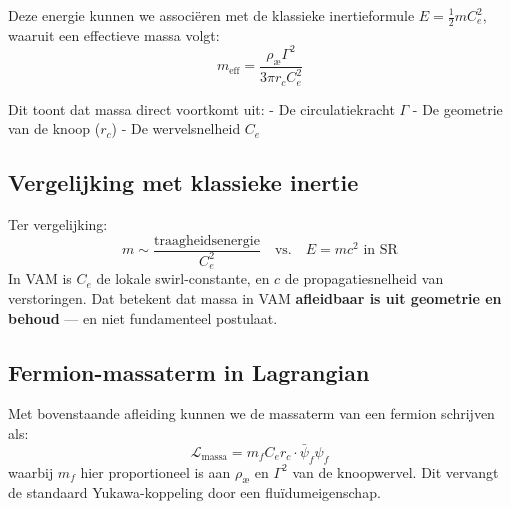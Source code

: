 Deze energie kunnen we associëren met de klassieke inertieformule $E = \frac{1}{2} m C_e^2$, waaruit een effectieve massa volgt:
\[
    m_\text{eff} = \frac{\rho_\text{\ae} \Gamma^2}{3\pi r_c C_e^2}
\]

Dit toont dat massa direct voortkomt uit:
- De circulatiekracht $\Gamma$
- De geometrie van de knoop ($r_c$)
- De wervelsnelheid $C_e$

\subsection*{Vergelijking met klassieke inertie}
Ter vergelijking:
\[
    m \sim \frac{\text{traagheidsenergie}}{C_e^2} \quad \text{vs.} \quad E = m c^2 \text{ in SR}
\]
In VAM is $C_e$ de lokale swirl-constante, en $c$ de propagatiesnelheid van verstoringen. Dat betekent dat massa in VAM \textbf{afleidbaar is uit
geometrie en behoud} — en niet fundamenteel postulaat.

\subsection*{Fermion-massaterm in Lagrangian}
Met bovenstaande afleiding kunnen we de massaterm van een fermion schrijven als:
\[
    \mathcal{L}_\text{massa} = m_f C_e r_c \cdot \bar{\psi}_f \psi_f
\]
waarbij $m_f$ hier proportioneel is aan $\rho_\text{\ae}$ en $\Gamma^2$ van de knoopwervel. Dit vervangt de standaard Yukawa-koppeling door een fluïdumeigenschap.